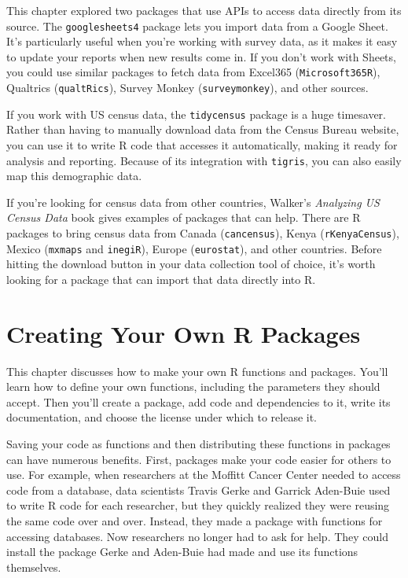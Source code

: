 \documentclass[
]{book}
\begin{document}
This chapter explored two packages that use APIs to access data directly from its source. The \texttt{googlesheets4} package lets you import data from a Google Sheet. It's particularly useful when you're working with survey data, as it makes it easy to update your reports when new results come in. If you don't work with Sheets, you could use similar packages to fetch data from Excel365 (\texttt{Microsoft365R}), Qualtrics (\texttt{qualtRics}), Survey Monkey (\texttt{surveymonkey}), and other sources.

If you work with US census data, the \texttt{tidycensus} package is a huge timesaver. Rather than having to manually download data from the Census Bureau website, you can use it to write R code that accesses it automatically, making it ready for analysis and reporting. Because of its integration with \texttt{tigris}, you can also easily map this demographic data.

If you're looking for census data from other countries, Walker's \emph{Analyzing US Census Data} book gives examples of packages that can help. There are R packages to bring census data from Canada (\texttt{cancensus}), Kenya (\texttt{rKenyaCensus}), Mexico (\texttt{mxmaps} and \texttt{inegiR}), Europe (\texttt{eurostat}), and other countries. Before hitting the download button in your data collection tool of choice, it's worth looking for a package that can import that data directly into R.

\hypertarget{packages-chapter}{%
\chapter{Creating Your Own R Packages}\label{packages-chapter}}

This chapter discusses how to make your own R functions and packages. You'll learn how to define your own functions, including the parameters they should accept. Then you'll create a package, add code and dependencies to it, write its documentation, and choose the license under which to release it.

Saving your code as functions and then distributing these functions in packages can have numerous benefits. First, packages make your code easier for others to use. For example, when researchers at the Moffitt Cancer Center needed to access code from a database, data scientists Travis Gerke and Garrick Aden-Buie used to write R code for each researcher, but they quickly realized they were reusing the same code over and over. Instead, they made a package with functions for accessing databases. Now researchers no longer had to ask for help. They could install the package Gerke and Aden-Buie had made and use its functions themselves.
\end{document}

